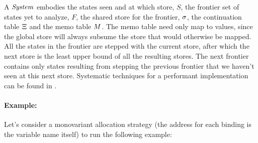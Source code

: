 A $\mathit{System}$ embodies the states seen and at which store, $S$, the frontier set of states yet to analyze, $F$, the shared store for the frontier, $\sigma$, the continuation table $\Xi$ and the memo table $M$.
%
The memo table need only map to values, since the global store will always subsume the store that would otherwise be mapped.
%
All the states in the frontier are stepped with the current store, after which the next store is the least upper bound of all the resulting stores.
%
The next frontier contains only states resulting from stepping the previous frontier that we haven't seen at this next store.
%
Systematic techniques for a performant implementation can be found in \citet{ianjohnson:oaam:icfp2013}.

\paragraph{Example:} Let's consider a monovariant allocation strategy (the address for each binding is the variable name itself) to run the following example:
\begin{SCodeFlow}\begin{RktBlk}\begin{SingleColumn}\RktPn{(}\mbox{}\RktPn{(}\RktPn{[}\mbox{}\RktPn{(}\RktSym{$\lambda$}\mbox{}\RktPn{(}\RktPn{)}\mbox{}\RktPn{)}\RktPn{]}

\mbox{}\RktPn{[}\mbox{}\RktPn{(}\mbox{}\RktPn{)}\RktPn{]}

\mbox{}\RktPn{[}\mbox{}\RktPn{(}\mbox{}\RktPn{)}\RktPn{]}\RktPn{)}

\mbox{}\RktPn{(}\RktSym{$\leq$}\mbox{}\mbox{}\RktPn{)}\RktPn{)}\end{SingleColumn}\end{RktBlk}\end{SCodeFlow}

